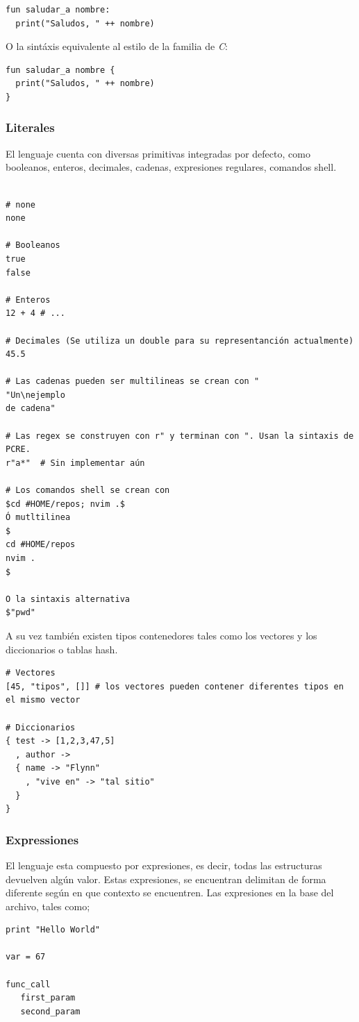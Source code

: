 \documentclass[11pt]{article}
\begin{document}
\begin{verbatim}
fun saludar_a nombre:
  print("Saludos, " ++ nombre)
\end{verbatim}

O la sintáxis equivalente al estilo de la familia de \emph{C}:
\begin{verbatim}
fun saludar_a nombre {
  print("Saludos, " ++ nombre)
}
\end{verbatim}

\subsubsection{Literales}
\label{sec:org3f6a920}

El lenguaje cuenta con diversas primitivas integradas por defecto, como
booleanos, enteros, decimales, cadenas, expresiones regulares, comandos
shell.

\begin{verbatim}

# none
none

# Booleanos
true
false

# Enteros
12 + 4 # ...

# Decimales (Se utiliza un double para su representanción actualmente)
45.5

# Las cadenas pueden ser multilineas se crean con "
"Un\nejemplo
de cadena"

# Las regex se construyen con r" y terminan con ". Usan la sintaxis de PCRE.
r"a*"  # Sin implementar aún

# Los comandos shell se crean con
$cd #HOME/repos; nvim .$
Ó mutltilinea
$
cd #HOME/repos
nvim .
$

O la sintaxis alternativa
$"pwd"
\end{verbatim}

A su vez también existen tipos contenedores tales como los vectores y los
diccionarios o tablas hash.

\begin{verbatim}
# Vectores
[45, "tipos", []] # los vectores pueden contener diferentes tipos en el mismo vector

# Diccionarios
{ test -> [1,2,3,47,5]
  , author ->
  { name -> "Flynn"
    , "vive en" -> "tal sitio"
  }
}

\end{verbatim}

\subsubsection{Expressiones}
\label{sec:org24928f6}
El lenguaje esta compuesto por expresiones, es decir, todas las estructuras devuelven algún valor. Estas expresiones, se encuentran delimitan de forma diferente según en que contexto
se encuentren.
Las expresiones en la base del archivo, tales como;
\begin{verbatim}
print "Hello World"

var = 67

func_call
   first_param
   second_param
\end{verbatim}
\end{document}
